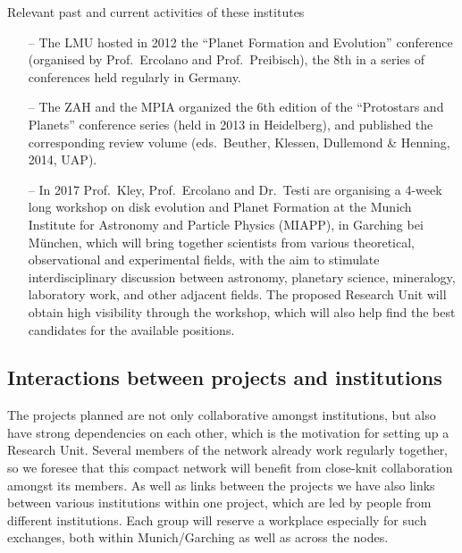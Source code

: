 \documentclass[10pt,fleqn,twoside,a4paper]{article}
\begin{document}
\begin{Emphasize}
Relevant past and current activities of these institutes
\end{Emphasize}
\begin{itemize}
\item[--] The LMU hosted in 2012 the ``Planet Formation and Evolution''
conference (organised by Prof.~Ercolano and Prof.~Preibisch), the 8th
in a series of conferences held regularly in Germany.
\item[--] The ZAH and the MPIA organized the 6th edition of the
``Protostars and Planets'' conference series (held in 2013 in Heidelberg), 
and published the corresponding review volume (eds.~Beuther,
Klessen, Dullemond \& Henning, 2014, UAP).
\item[--] In 2017
Prof.~Kley, Prof.~Ercolano and Dr.~Testi are organising a 4-week
long workshop on disk evolution and Planet Formation at the Munich
Institute for Astronomy and Particle Physics (MIAPP), in Garching bei
M\"unchen, which will bring
together scientists from various theoretical, observational and
experimental fields, with the aim to stimulate interdisciplinary
discussion between astronomy, planetary science, mineralogy,
laboratory work, and other adjacent fields. The proposed Research Unit
will obtain high visibility through the workshop, which will also help
find the best candidates for the available positions. 
\end{itemize}


\subsection{Interactions between projects and institutions}
\label{sec-interactions-between-projects}
\noindent The projects planned are not only collaborative amongst institutions,
but also have strong dependencies on each other, which is the
motivation for setting up a Research Unit. Several members of the
network already work regularly together, so we foresee that this compact
network will benefit from close-knit collaboration amongst its members.
As well as links between the projects we have also links between
various institutions within one project, which are led by people from
different institutions. 
Each group will reserve a workplace especially 
for such exchanges, both within Munich/Garching as well as across the nodes. 
\end{document}
